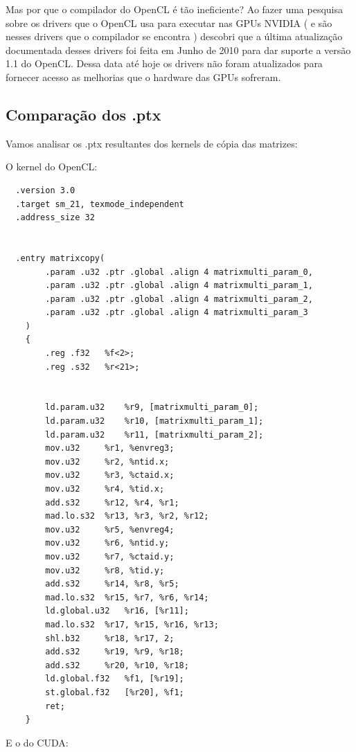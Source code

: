 Mas por que o compilador do OpenCL é tão ineficiente? Ao fazer uma pesquisa sobre os drivers que o OpenCL usa para executar nas GPUs NVIDIA
( e são nesses drivers que o compilador se encontra ) descobri que a última atualização documentada desses drivers foi feita em Junho de 2010
para dar suporte a versão 1.1 do OpenCL. Dessa data até hoje os drivers não foram atualizados para fornecer acesso as melhorias que o
hardware das GPUs sofreram.

\subsection{Comparação dos .ptx}

Vamos analisar os .ptx resultantes dos kernels de cópia das matrizes:

O kernel do OpenCL: 

\begin{lstlisting}
  .version 3.0
  .target sm_21, texmode_independent
  .address_size 32


  .entry matrixcopy(
	    .param .u32 .ptr .global .align 4 matrixmulti_param_0,
	    .param .u32 .ptr .global .align 4 matrixmulti_param_1,
	    .param .u32 .ptr .global .align 4 matrixmulti_param_2,
	    .param .u32 .ptr .global .align 4 matrixmulti_param_3
    )
    {
	    .reg .f32 	%f<2>;
	    .reg .s32 	%r<21>;


	    ld.param.u32 	%r9, [matrixmulti_param_0];
	    ld.param.u32 	%r10, [matrixmulti_param_1];
	    ld.param.u32 	%r11, [matrixmulti_param_2];
	    mov.u32 	%r1, %envreg3;
	    mov.u32 	%r2, %ntid.x;
	    mov.u32 	%r3, %ctaid.x;
	    mov.u32 	%r4, %tid.x;
	    add.s32 	%r12, %r4, %r1;
	    mad.lo.s32 	%r13, %r3, %r2, %r12;
	    mov.u32 	%r5, %envreg4;
	    mov.u32 	%r6, %ntid.y;
	    mov.u32 	%r7, %ctaid.y;
	    mov.u32 	%r8, %tid.y;
	    add.s32 	%r14, %r8, %r5;
	    mad.lo.s32 	%r15, %r7, %r6, %r14;
	    ld.global.u32 	%r16, [%r11];
	    mad.lo.s32 	%r17, %r15, %r16, %r13;
	    shl.b32 	%r18, %r17, 2;
	    add.s32 	%r19, %r9, %r18;
	    add.s32 	%r20, %r10, %r18;
	    ld.global.f32 	%f1, [%r19];
	    st.global.f32 	[%r20], %f1;
	    ret;
    }
\end{lstlisting}

E o do CUDA:

